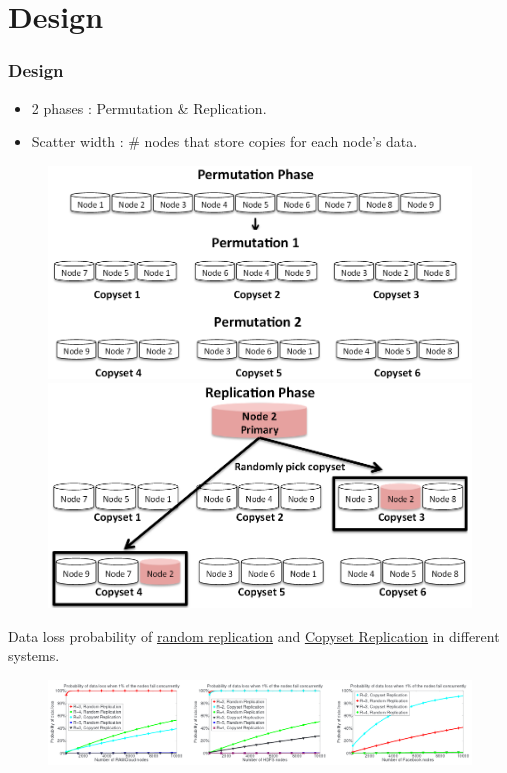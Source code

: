 \documentclass[xcolor=table]{beamer}
\begin{document}
	\section{Design}
	\begin{frame}
		\frametitle{Design}
		\begin{itemize}
			\small
			\item 2 phases : \alert{Permutation} \& \alert{Replication}.
			\item Scatter width : \# nodes that store copies for each node’s data.
		\end{itemize}
		\begin{figure}[htb]
			\begin{minipage}[b]{0.49\linewidth}
				\centering
				\graphicspath{{fig/}}
				\includegraphics[width=1\textwidth]{5.png}
			\end{minipage}
			\begin{minipage}[b]{0.49\linewidth}
				\centering
				\graphicspath{{fig/}}
				\includegraphics[width=1\textwidth]{6.png}
			\end{minipage}
		\end{figure}
	\end{frame}

	\begin{frame}
		\small
		\alert{Data loss probability} of \underline{random replication} and \underline{Copyset Replication} in different systems.
		\begin{figure}[htb]
			\centering
			\graphicspath{{fig/}}
			\includegraphics[width=1\textwidth]{7.png}
		\end{figure}
	\end{frame}
\end{document}
